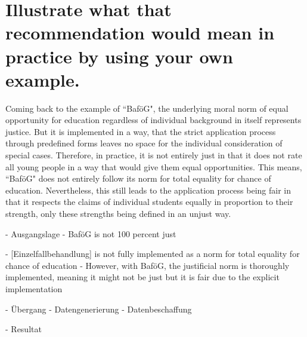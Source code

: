 \section*{Illustrate what that recommendation would mean in practice by using your own example.}

Coming back to the example of ``BaföG", the underlying moral norm of equal opportunity for education regardless of individual background in itself represents justice.
But it is implemented in a way, that the strict application process through predefined forms leaves no space for the individual consideration of special cases.
Therefore, in practice, it is not entirely just in that it does not rate all young people in a way that would give them equal opportunities.
This means, ``BaföG" does not entirely follow its norm for total equality for chance of education.
Nevertheless, this still leads to the application process being fair in that it respects the claims of individual students equally in proportion to their strength, only these strengths being defined in an unjust way.

- Ausgangslage
  - BaföG is not 100 percent just

  - [Einzelfallbehandlung] is not fully implemented as a norm for total equality for chance of education
  - However, with BaföG, the justificial norm is thoroughly implemented, meaning it might not be just but it is fair due to the explicit implementation

- Übergang
  - Datengenerierung
  - Datenbeschaffung

- Resultat

